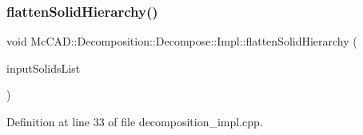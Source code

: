 \subsubsection{\texorpdfstring{flatten\+Solid\+Hierarchy()}{flattenSolidHierarchy()}\hspace{0.1cm}{\footnotesize\ttfamily [1/2]}}
{\footnotesize\ttfamily void Mc\+C\+A\+D\+::\+Decomposition\+::\+Decompose\+::\+Impl\+::flatten\+Solid\+Hierarchy (\begin{DoxyParamCaption}\item[{const Handle\+\_\+\+Top\+Tools\+\_\+\+H\+Sequence\+Of\+Shape \&}]{input\+Solids\+List }\end{DoxyParamCaption})}



Definition at line 33 of file decomposition\+\_\+impl.\+cpp.


